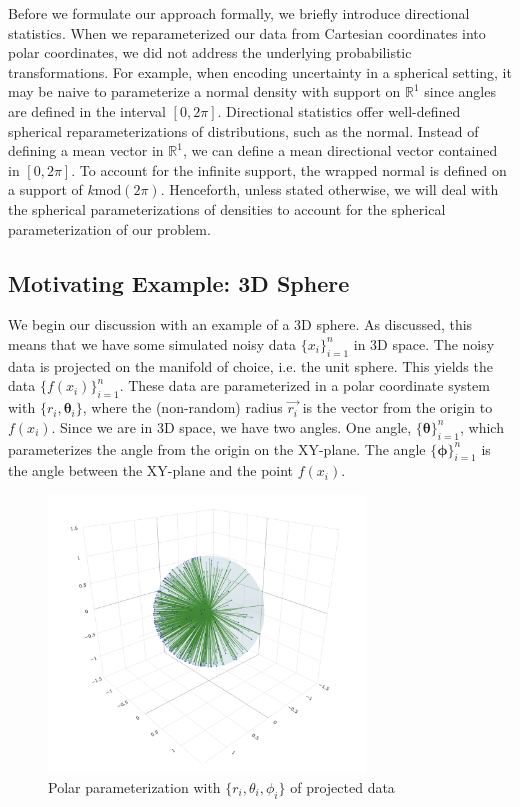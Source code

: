 \documentclass[twoside,11pt]{article}
\begin{document}
Before we formulate our approach formally, we briefly introduce directional statistics. When we reparameterized our data from Cartesian coordinates into polar coordinates, we did not address the underlying probabilistic transformations. For example, when encoding uncertainty in a spherical setting, it may be naive to parameterize a normal density with support on $\mathbb{R}^1$ since angles are defined in the interval $[0, 2\pi]$. Directional statistics offer well-defined spherical reparameterizations of distributions, such as the normal. Instead of defining a mean vector in $\mathbb{R}^1$, we can define a mean directional vector contained in $[0, 2\pi]$. To account for the infinite support, the wrapped normal is defined on a support of $k\text{mod}(2\pi)$. Henceforth, unless stated otherwise, we will deal with the spherical parameterizations of densities to account for the spherical parameterization of our problem. 

\subsection{Motivating Example: 3D Sphere}

We begin our discussion with an example of a 3D sphere. As discussed, this means that we have some simulated noisy data $\{x_i\}_{i=1}^n$ in 3D space. The noisy data is projected on the manifold of choice, i.e. the unit sphere. This yields the data $\{f(x_i)\}_{i=1}^n$. These data are parameterized in a polar coordinate system with $\{r_i, \mathbf{\theta}_i\}$, where the (non-random) radius $\vec{r_i}$ is the vector from the origin to $f(x_i)$. Since we are in 3D space, we have two angles. One angle, $\{\mathbf{\theta}\}_{i=1}^n$, which parameterizes the angle from the origin on the XY-plane. The angle $\{\mathbf{\phi}\}_{i=1}^n$ is the angle between the XY-plane and the point $f(x_i)$. 

\begin{figure}[h!]
  \begin{center}
    \includegraphics[width=0.75\textwidth]{../fig/projections-from-origin.png}
  \end{center}
  \caption{Polar parameterization with $\{r_i, \theta_i, \phi_i\}$ of projected data}\label{fig:projections-from-origin}
\end{figure}
\end{document}
